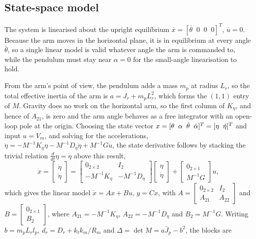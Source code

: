 \subsection{State-space model}
The system is linearised about the upright equilibrium $\bar x=[\bar\theta\;\;0\;\;0\;\;0]^T$, $\bar u=0$. Because the arm moves in the horizontal plane, it is in equilibrium at every angle $\bar\theta$, so a single linear model is valid whatever angle the arm is commanded to, while the pendulum must stay near $\alpha=0$ for the small-angle linearisation to hold.

From the arm's point of view, the pendulum adds a mass $m_p$ at radius $L_r$, so the total effective inertia of the arm is $a=J_r+m_pL_r^2$, which forms the $(1,1)$ entry of $M$. Gravity does no work on the horizontal arm, so the first column of $K_\eta$, and hence of $A_{21}$, is zero and the arm angle behaves as a free integrator with an open-loop pole at the origin.
Choosing the state vector $x=[\theta\;\;\alpha\;\;\dot\theta\;\;\dot\alpha]^T=[\eta\;\;\dot\eta]^T$ and input $u=V_m$, and solving for the accelerations, $\ddot\eta=-M^{-1}K_\eta\eta-M^{-1}D_\eta\dot\eta+M^{-1}Gu$, the state derivative follows by stacking the trivial relation $\frac{d}{dt}\eta=\dot\eta$ above this result,
\begin{equation}
\dot x=\begin{bmatrix}\dot\eta\\\ddot\eta\end{bmatrix}=\begin{bmatrix}0_{2\times2}&I_2\\-M^{-1}K_\eta&-M^{-1}D_\eta\end{bmatrix}\begin{bmatrix}\eta\\\dot\eta\end{bmatrix}+\begin{bmatrix}0_{2\times1}\\M^{-1}G\end{bmatrix}u, \label{eq:stack}
\end{equation}
which gives the linear model $\dot x=Ax+Bu$, $y=Cx$, with $A=\left[\begin{smallmatrix}0_{2\times2}&I_2\\A_{21}&A_{22}\end{smallmatrix}\right]$ and $B=\left[\begin{smallmatrix}0_{2\times1}\\B_2\end{smallmatrix}\right]$, where $A_{21}=-M^{-1}K_\eta$, $A_{22}=-M^{-1}D_\eta$ and $B_2=M^{-1}G$. Writing $b=m_pL_rl_p$, $d_r=D_r+k_tk_m/R_m$ and $\Delta=\det M=a\bar J_p-b^2$, the blocks are
